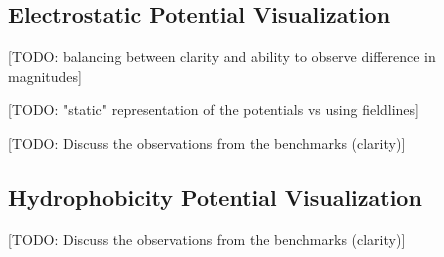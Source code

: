   \subsection{Electrostatic Potential Visualization}
    [TODO: balancing between clarity and ability to observe difference in magnitudes]

    [TODO: "static" representation of the potentials vs using fieldlines]

    [TODO: Discuss the observations from the benchmarks (clarity)]

  \subsection{Hydrophobicity Potential Visualization}
    [TODO: Discuss the observations from the benchmarks (clarity)]


